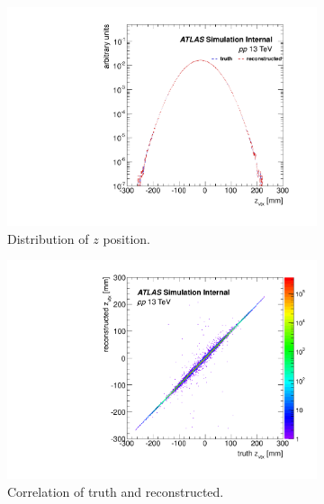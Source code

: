 \begin{figure}[H]

\begin{subfigure}{0.5\textwidth}
\centering
\includegraphics[width=1.\linewidth]{figs/sec_evtSlc/trkEff_pp13_mon_dis_zVtx.pdf}
\caption{Distribution of $z$ position.}
\end{subfigure}
\begin{subfigure}{0.5\textwidth}
\centering
\includegraphics[width=1.\linewidth]{figs/sec_evtSlc/trkEff_pp13_mon_crr_zVtx.pdf}
\caption{Correlation of truth and reconstructed.}
\end{subfigure}
\begin{subfigure}{0.5\textwidth}
\centering

\end{subfigure}
\end{figure}

